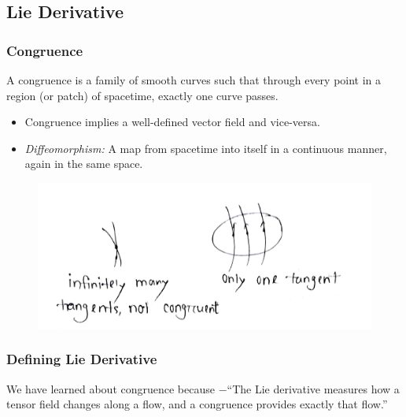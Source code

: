 \documentclass[14pt]{article} %
\begin{document}
\subsection{Lie Derivative}

\subsubsection{Congruence}
A congruence is a family of smooth curves such that through every point in a region (or patch) of spacetime, exactly one curve passes.

\begin{itemize}
    \item Congruence implies a well-defined vector field and vice-versa.
    \item \textit{Diffeomorphism:} A map from spacetime into itself in a continuous manner, again in the same space.
\end{itemize}
\vspace{-0.5cm}
\begin{figure}[H]
\centering
\includegraphics[width=0.7\linewidth]{figures/L3_2.jpg}
\caption*{}
\end{figure}
\vspace{-1cm}
\noindent 
\subsubsection*{Defining Lie Derivative}
We have learned about congruence because $-$``The Lie derivative measures how a tensor field changes along a flow, and a congruence provides exactly that flow.''
\end{document}
